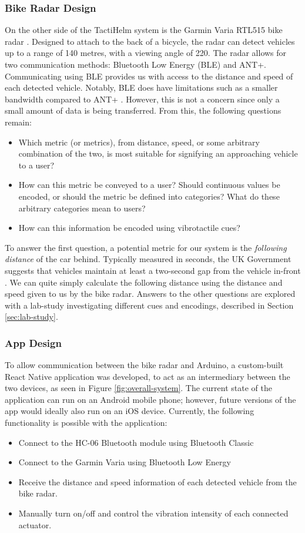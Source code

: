 \documentclass{mpaper}
\begin{document}
\subsubsection{Bike Radar Design}
On the other side of the TactiHelm system is the Garmin Varia RTL515 bike radar \cite{garminradar}. Designed to attach to the back of a bicycle, the radar can detect vehicles up to a range of 140 metres, with a viewing angle of 220\degree{}. The radar allows for two communication methods: Bluetooth Low Energy (BLE) and ANT+. Communicating using BLE provides us with access to the distance and speed of each detected vehicle. Notably, BLE does have limitations such as a smaller bandwidth compared to ANT+ \cite{bluetoothlimitations}. However, this is not a concern since only a small amount of data is being transferred. From this, the following questions remain:
\begin{itemize}
    \item Which metric (or metrics), from distance, speed, or some arbitrary combination of the two, is most suitable for signifying an approaching vehicle to a user?
    \item How can this metric be conveyed to a user? Should continuous values be encoded, or should the metric be defined into categories? What do these arbitrary categories mean to users? 
    \item How can this information be encoded using vibrotactile cues?
\end{itemize}

To answer the first question, a potential metric for our system is the \textit{following distance} of the car behind. Typically measured in seconds, the UK Government suggests that vehicles maintain at least a two-second gap from the vehicle in-front \cite{followdistance}. We can quite simply calculate the following distance using the distance and speed given to us by the bike radar. Answers to the other questions are explored with a lab-study investigating different cues and encodings, described in Section \ref{sec:lab-study}.


\subsubsection{App Design}
To allow communication between the bike radar and Arduino, a custom-built React Native application was developed, to act as an intermediary between the two devices, as seen in Figure \ref{fig:overall-system}. The current state of the application can run on an Android mobile phone; however, future versions of the app would ideally also run on an iOS device. Currently, the following functionality is possible with the application:
\begin{itemize}
    \item Connect to the HC-06 Bluetooth module using Bluetooth Classic
    \item Connect to the Garmin Varia using Bluetooth Low Energy
    \item Receive the distance and speed information of each detected vehicle from the bike radar.
    \item Manually turn on/off and control the vibration intensity of each connected actuator.
\end{itemize}
\end{document}
